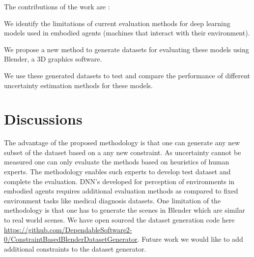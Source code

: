 The contributions of the work are : 
\begin{inparaenum}
	\item We identify the limitations of
	current evaluation methods for deep learning models used in embodied
	agents (machines that interact with their environment).
	\item We propose a
	new method to generate datasets for evaluating these models using
	Blender, a 3D graphics software.
	\item  We use these generated datasets to test and
	compare the performance of different uncertainty estimation methods for
	these models.
\end{inparaenum}







\hypertarget{discussions}{%
\section{Discussions}\label{discussions}}
The advantage of the proposed methodology is that one can generate any new subset of the dataset based on a any new constraint. As uncertainty cannot be measured one can only evaluate the methods based on heuristics of human experts. The methodology enables such experts to develop test dataset and complete the evaluation. DNN's developed for perception of environments in embodied agents requires additional evaluation methods as compared to fixed environment tasks like medical diagnosis datasets.  One limitation of the methodology is that one has to generate the scenes in Blender which are similar to real world scenes. We have open sourced the dataset generation code here \url{https://github.com/DependableSoftware2-0/ConstraintBasedBlenderDatasetGenerator}. Future work we would like to add additional constraints to the dataset generator.

